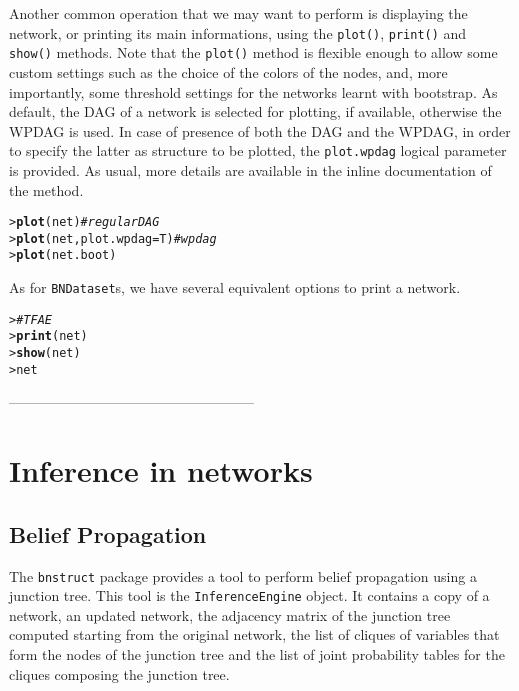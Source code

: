 \documentclass{article}\usepackage[]{graphicx}\usepackage[]{color}
\makeatletter
\newcommand{\hlcom}[1]{\textcolor[rgb]{0.678,0.584,0.686}{\textit{#1}}}%
\newcommand{\hlstd}[1]{\textcolor[rgb]{0.345,0.345,0.345}{#1}}%
\newcommand{\hlkwc}[1]{\textcolor[rgb]{0.333,0.667,0.333}{#1}}%
\newcommand{\hlkwd}[1]{\textcolor[rgb]{0.737,0.353,0.396}{\textbf{#1}}}%
\newenvironment{kframe}{%
 \def\at@end@of@kframe{}%
 \ifinner\ifhmode%
  \def\at@end@of@kframe{\end{minipage}}%
  \begin{minipage}{\columnwidth}%
 \fi\fi%
 \def\FrameCommand##1{\hskip\@totalleftmargin \hskip-\fboxsep
 \colorbox{shadecolor}{##1}\hskip-\fboxsep
     \hskip-\linewidth \hskip-\@totalleftmargin \hskip\columnwidth}%
 \MakeFramed {\advance\hsize-\width
   \@totalleftmargin\z@ \linewidth\hsize
   \@setminipage}}%
 {\par\unskip\endMakeFramed%
 \at@end@of@kframe}
\newenvironment{knitrout}{}{} %
\newcommand{\Robject}[1]{{\texttt{#1}}}
\newcommand{\Rpackage}[1]{{\texttt{#1}}}
\newcommand{\Rmethod}[1]{{\texttt{#1}}}
\newcommand{\Rfunarg}[1]{{\texttt{#1}}}
\makeatother
\begin{document}
Another common operation that we may want to perform is displaying the network, or printing its main informations, using the
\Rmethod{plot()}, \Rmethod{print()} and \Rmethod{show()} methods. Note that the \Rmethod{plot()} method is flexible enough to allow 
some custom settings such as the choice of the colors of the nodes, and, more importantly, some threshold settings 
for the networks learnt with bootstrap. As default, the DAG of a network is selected for plotting, if available,
otherwise the WPDAG is used. In case of presence of both the DAG and the WPDAG, in order to specify the latter as
structure to be plotted, the \Rfunarg{plot.wpdag} logical parameter is provided. As usual, more details are available
in the inline documentation of the method.
\begin{knitrout}
\color{fgcolor}\begin{kframe}
\begin{alltt}
\hlstd{> }\hlkwd{plot}\hlstd{(net)} \hlcom{# regular DAG}
\hlstd{> }\hlkwd{plot}\hlstd{(net,} \hlkwc{plot.wpdag}\hlstd{=T)} \hlcom{# wpdag}
\hlstd{> }\hlkwd{plot}\hlstd{(net.boot)}
\end{alltt}
\end{kframe}
\end{knitrout}

As for \Robject{BNDataset}s, we have several equivalent options to print a network.
\begin{knitrout}
\color{fgcolor}\begin{kframe}
\begin{alltt}
\hlstd{> }\hlcom{# TFAE}
\hlstd{> }\hlkwd{print}\hlstd{(net)}
\hlstd{> }\hlkwd{show}\hlstd{(net)}
\hlstd{> }\hlstd{net}
\end{alltt}
\end{kframe}
\end{knitrout}

-----------------------------------------------------


\section{Inference in networks}
\subsection{Belief Propagation}
The \Rpackage{bnstruct} package provides a tool to perform belief propagation using a junction tree.
This tool is the \Robject{InferenceEngine} object.
It contains a copy of a network, an updated network, the adjacency matrix of the junction tree computed
starting from the original network, the list of cliques of variables that form the nodes of the junction tree
and the list of joint probability tables for the cliques composing the junction tree.
\end{document}
